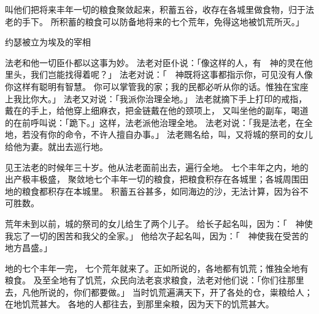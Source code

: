 {叫他们把将来丰年一切的粮食聚敛起来，积蓄五谷，收存在各城里做食物，归于法老的手下。
所积蓄的粮食可以防备{}地将来的七个荒年，免得这地被饥荒所灭。」
\par }{\SH 约瑟被立为埃及的宰相
\par }{\PP {}法老和他一切臣仆都以这事为妙。
法老对臣仆说：「像这样的人，有　神的灵在他里头，我们岂能找得着呢？」
法老对{}说：「　神既将这事都指示你，可见没有人像你这样有聪明有智慧。
你可以掌管我的家；我的民都必听从你的话。惟独在宝座上我比你大。」
法老又对{}说：「我派你治理{}全地。」
法老就摘下手上打印的戒指，戴在{}的手上，给他穿上细麻衣，把金链戴在他的颈项上，
又叫{}坐他的副车，喝道的在前呼叫说：「跪下。」这样，法老派他治理{}全地。
法老对{}说：「我是法老，在{}全地，若没有你的命令，不许人擅自办事。」
法老赐名给{}，叫{}，又将{}城的祭司{}的女儿{}给他为妻。{}就出去巡行{}地。
\par }{\PP {}见{}王法老的时候年三十岁。他从法老面前出去，遍行{}全地。
七个丰年之内，地的出产极丰极盛，
聚敛{}地七个丰年一切的粮食，把粮食积存在各城里；各城周围田地的粮食都积存在本城里。
积蓄五谷甚多，如同海边的沙，无法计算，因为谷不可胜数。
\par }{\PP {}荒年未到以前，{}城的祭司{}的女儿{}给{}生了两个儿子。
给长子起名叫{}，因为{}：「　神使我忘了一切的困苦和我父的全家。」
他给次子起名叫{}，因为{}：「　神使我在受苦的地方昌盛。」
\par }{\PP {}地的七个丰年一完，
七个荒年就来了。正如{}所说的，各地都有饥荒；惟独{}全地有粮食。
及至{}全地有了饥荒，众民向法老哀求粮食，法老对他们说：「你们往{}那里去，凡他所说的，你们都要做。」
当时饥荒遍满天下，{}开了各处的仓，粜粮给{}人；在{}地饥荒甚大。
各地的人都往{}去，到{}那里籴粮，因为天下的饥荒甚大。

}
